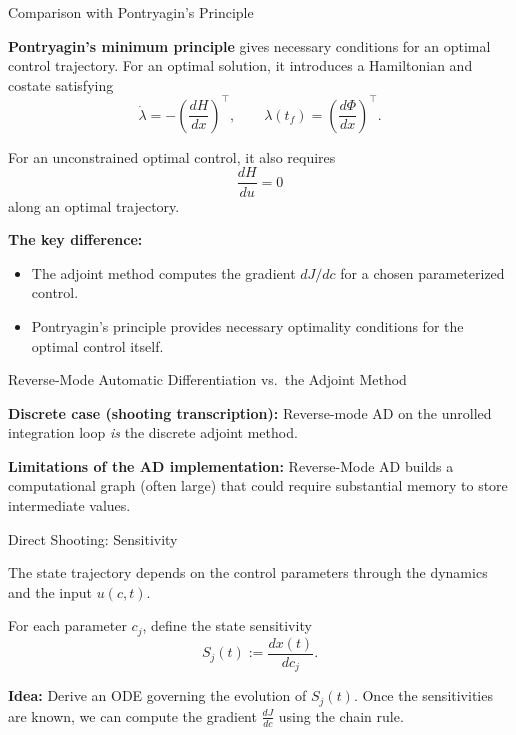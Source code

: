 \documentclass{beamer}
\begin{document}
\begin{frame}{Comparison with Pontryagin's Principle}
	\begin{flushleft}
		
		\textbf{Pontryagin's minimum principle} gives necessary
		conditions for an optimal control trajectory. For an optimal solution, it introduces a Hamiltonian
		and costate satisfying
		\[
		\dot{\lambda}=-\left(\frac{dH}{dx}\right)^\top,
		\qquad
		\lambda(t_f)=\left(\frac{d\Phi}{dx}\right)^\top.
		\]
		
		For an unconstrained optimal control, it also requires
		\[
		\frac{dH}{du}=0
		\]
		along an optimal trajectory.
		
		\textbf{The key difference:}
		\begin{itemize}
			\item The adjoint method computes the gradient
			$dJ/dc$ for a chosen parameterized control.
			\item Pontryagin's principle provides necessary
			optimality conditions for the optimal control itself.
		\end{itemize}
		
	\end{flushleft}
\end{frame}



\begin{frame}{Reverse-Mode Automatic Differentiation vs.\ the Adjoint Method}
	\begin{flushleft}
		
		\textbf{Discrete case (shooting transcription):} Reverse-mode AD on the unrolled integration loop
		\emph{is} the discrete adjoint method.
		
		\bigskip
		
		\textbf{Limitations of the AD implementation:} Reverse-Mode AD builds a computational graph (often large) that could require substantial memory to store intermediate values.
		
	\end{flushleft}
\end{frame}




\begin{frame}{Direct Shooting: Sensitivity}
	\begin{flushleft}
		The state trajectory depends on the control parameters
		through the dynamics and the input $u(c,t)$.
		
		For each parameter $c_j$, define the state sensitivity
		\[
		S_j(t) := \frac{dx(t)}{dc_j}.
		\]
		
		\bigskip
		
		\textbf{Idea:} Derive an ODE governing the evolution of
		$S_j(t)$. Once the sensitivities are known, we can compute
		the gradient $\frac{dJ}{dc}$ using the chain rule.
	\end{flushleft}
\end{frame}
\end{document}
